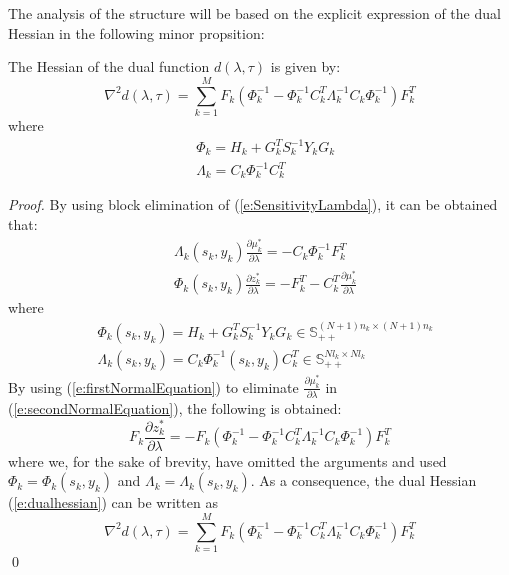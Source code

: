 The analysis of the structure will be based on the explicit expression of the dual Hessian in the following minor propsition:
\begin{proposition}
The Hessian of the dual function $d(\lambda, \tau)$ is given by:
\begin{equation}
\label{e:dualhessian2}
\nabla^2 d(\lambda, \tau) = \sum_{k=1}^M F_k (\Phi_k^{-1} - \Phi_k^{-1} C_k^T \Lambda_k^{-1} C_k \Phi_k^{-1}) F_k^T
\end{equation}
where
\begin{align}
& \Phi_k = H_k + G_k^T S_k^{-1} Y_k G_k \label{e:Phi} \\
& \Lambda_k = C_k \Phi_k^{-1} C_k^{T} \label{e:Lambda}
\end{align}
\end{proposition}
\begin{proof}
By using block elimination of (\ref{e:SensitivityLambda}), it can be obtained that:
\begin{subequations}
\begin{align}
& \Lambda_k (s_k, y_k) \frac{\partial \mu_k^*}{\partial \lambda} = -C_k \Phi_k^{-1} F_k^T \label{e:firstNormalEquation} \\
& \Phi_k (s_k, y_k) \frac{\partial z_k^*}{\partial \lambda} = -F_k^T - C_k^T \frac{\partial \mu_k^*}{\partial \lambda} \label{e:secondNormalEquation}
\end{align}
\end{subequations}
where
\begin{subequations}
\begin{align}
& \Phi_k (s_k, y_k) = H_k + G_k^T S_k^{-1} Y_k G_k \in \mathbb{S}_{++}^{(N+1)n_k \times (N+1)n_k} \\
& \Lambda_k (s_k, y_k) = C_k \Phi_k^{-1}(s_k, y_k) C_k^{T} \in \mathbb{S}_{++}^{N l_k \times N l_k}
\end{align}
\end{subequations}
By using (\ref{e:firstNormalEquation}) to eliminate $\frac{\partial \mu_k^*}{\partial \lambda}$ in (\ref{e:secondNormalEquation}), the following is obtained:
\begin{equation}
\label{e:localcontributions}
F_k \frac{\partial z_k^*}{\partial \lambda} = -F_k (\Phi_k^{-1} - \Phi_k^{-1} C_k^T \Lambda_k^{-1} C_k \Phi_k^{-1}) F_k^T
\end{equation}
where we, for the sake of brevity, have omitted the arguments and used $\Phi_k = \Phi_k(s_k, y_k)$ and $\Lambda_k = \Lambda_k (s_k, y_k)$. As a consequence, the dual Hessian (\ref{e:dualhessian}) can be written as
\begin{equation}
\nabla^2 d(\lambda, \tau) = \sum_{k=1}^M F_k (\Phi_k^{-1} - \Phi_k^{-1} C_k^T \Lambda_k^{-1} C_k \Phi_k^{-1}) F_k^T
\end{equation}
\qed
\end{proof}
